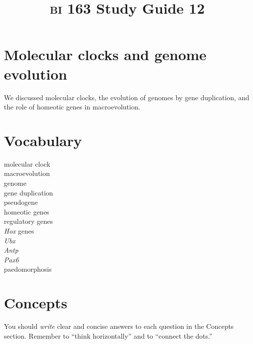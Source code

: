 \documentclass[letterpaper]{tufte-handout}
\title{{\scshape bi} 163 Study Guide 12}
\date{} %
\begin{document}
\maketitle	%

\section*{Molecular clocks and genome evolution}

We discussed molecular clocks, the evolution of genomes by gene duplication, and the role of homeotic genes in macroevolution.

\section*{Vocabulary}

\vspace{-1\baselineskip}
\begin{multicols}{2}
molecular clock \\
macroevolution  \\
genome  \\
gene duplication  \\
pseudogene \\
homeotic genes \\
regulatory genes \\
\textit{Hox} genes \\
\textit{Ubx} \\
\textit{Antp} \\
\textit{Pax6} \\
paedomorphosis

\end{multicols}

\section*{Concepts}

You should \emph{write} clear and concise answers to each question in the Concepts section.  Remember to ``think horizontally'' and to ``connect the dots.'' 
\end{document}

